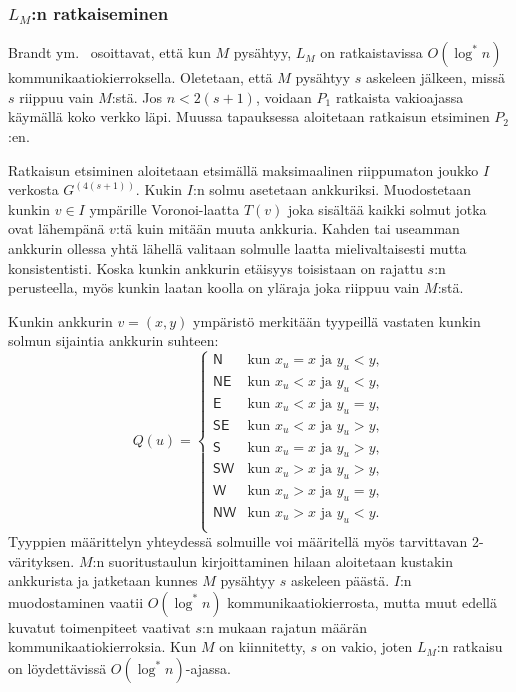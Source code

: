 \documentclass[12pt,finnish]{tktltiki2}
\theoremstyle{definition}
\theoremstyle{remark}
\begin{document}
\subsubsection{$L_M$:n ratkaiseminen}
Brandt ym.~\cite{brandt} osoittavat, että kun $M$ pysähtyy, $L_M$ on ratkaistavissa $O(\log^* n)$ kommunikaatiokierroksella. Oletetaan, että $M$ pysähtyy $s$ askeleen jälkeen, missä $s$ riippuu vain $M$:stä. Jos $n < 2(s + 1)$, voidaan $P_1$ ratkaista vakioajassa käymällä koko verkko läpi. Muussa tapauksessa aloitetaan ratkaisun etsiminen $P_2$:en.

Ratkaisun etsiminen aloitetaan etsimällä maksimaalinen riippumaton joukko $I$ verkosta $G^{(4(s+1))}$. Kukin $I$:n solmu asetetaan ankkuriksi. Muodostetaan kunkin $v \in I$ ympärille Voronoi-laatta $T(v)$ joka sisältää kaikki solmut jotka ovat lähempänä $v$:tä kuin mitään muuta ankkuria. Kahden tai useamman ankkurin ollessa yhtä lähellä valitaan solmulle laatta mielivaltaisesti mutta konsistentisti. Koska kunkin ankkurin etäisyys toisistaan on rajattu $s$:n perusteella, myös kunkin laatan koolla on yläraja joka riippuu vain $M$:stä.

Kunkin ankkurin $v = (x, y)$ ympäristö merkitään tyypeillä vastaten kunkin solmun sijaintia ankkurin suhteen:
\[
 Q(u) = 
  \begin{cases} 
   \mathsf{N} & \text{kun } x_u = x \text{ ja } y_u < y, \\
   \mathsf{NE} & \text{kun } x_u < x \text{ ja } y_u < y, \\
   \mathsf{E} & \text{kun } x_u < x \text{ ja } y_u = y, \\
   \mathsf{SE} & \text{kun } x_u < x \text{ ja } y_u > y, \\
   \mathsf{S} & \text{kun } x_u = x \text{ ja } y_u > y, \\
   \mathsf{SW} & \text{kun } x_u > x \text{ ja } y_u > y, \\
   \mathsf{W} & \text{kun } x_u > x \text{ ja } y_u = y, \\
   \mathsf{NW} & \text{kun } x_u > x \text{ ja } y_u < y. \\
  \end{cases}
\]
Tyyppien määrittelyn yhteydessä solmuille voi määritellä myös tarvittavan 2-värityksen. $M$:n suoritustaulun kirjoittaminen hilaan aloitetaan kustakin ankkurista ja jatketaan kunnes $M$ pysähtyy $s$ askeleen päästä. $I$:n muodostaminen vaatii $O(\log^* n)$ kommunikaatiokierrosta, mutta muut edellä kuvatut toimenpiteet vaativat $s$:n mukaan rajatun määrän kommunikaatiokierroksia. Kun $M$ on kiinnitetty, $s$ on vakio, joten $L_M$:n ratkaisu on löydettävissä $O(\log^* n)$-ajassa.
\end{document}
